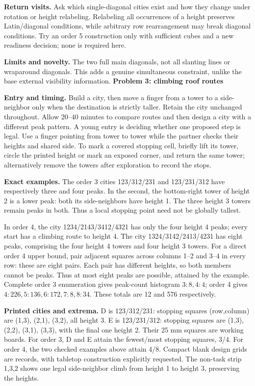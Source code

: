 \documentclass[11pt]{article}
\newcommand\lead[1]{\textbf{#1}\par}
\begin{document}
\textbf{Return visits.} Ask which single-diagonal cities exist and how they change under rotation or height relabeling. Relabeling all occurrences of a height preserves Latin/diagonal conditions, while arbitrary row rearrangement may break diagonal conditions. Try an order 5 construction only with sufficient cubes and a new readiness decision; none is required here.

\textbf{Limits and novelty.} The two full main diagonals, not all slanting lines or wraparound diagonals. This adds a genuine simultaneous constraint, unlike the base external visibility information.
\newpage
\lead{Problem 3: climbing roof routes}
\textbf{Entry and timing.} Build a city, then move a finger from a tower to a side-neighbor only when the destination is strictly taller. Retain the city unchanged throughout. Allow 20--40 minutes to compare routes and then design a city with a different peak pattern. A young entry is deciding whether one proposed step is legal. Use a finger pointing from tower to tower while the partner checks their heights and shared side. To mark a covered stopping cell, briefly lift its tower, circle the printed height or mark an exposed corner, and return the same tower; alternatively remove the towers after exploration to record the stops.

\textbf{Exact examples.} The order 3 cities 123/312/231 and 123/231/312 have respectively three and four peaks. In the second, the bottom-right tower of height 2 is a lower peak: both its side-neighbors have height 1. The three height 3 towers remain peaks in both. Thus a local stopping point need not be globally tallest.

In order 4, the city 1234/2143/3412/4321 has only the four height 4 peaks; every start has a climbing route to height 4. The city 1324/3142/2413/4231 has eight peaks, comprising the four height 4 towers and four height 3 towers. For a direct order 4 upper bound, pair adjacent squares across columns 1--2 and 3--4 in every row: these are eight pairs. Each pair has different heights, so both members cannot be peaks. Thus at most eight peaks are possible, attained by the example. Complete order 3 enumeration gives peak-count histogram $3:8,4:4$; order 4 gives $4:226,5:136,6:172,7:8,8:34$. These totals are 12 and 576 respectively.

\textbf{Printed cities and extrema.} D is 123/312/231: stopping squares (row,column) are (1,3), (2,1), (3,2), all height 3. E is 123/231/312: stopping squares are (1,3), (2,2), (3,1), (3,3), with the final one height 2. Their 25 mm squares are working boards. For order 3, D and E attain the fewest/most stopping squares, 3/4. For order 4, the two checked examples above attain 4/8. Compact blank design grids are records, with tabletop construction explicitly requested. The non-task strip 1,3,2 shows one legal side-neighbor climb from height 1 to height 3, preserving the heights.
\end{document}
